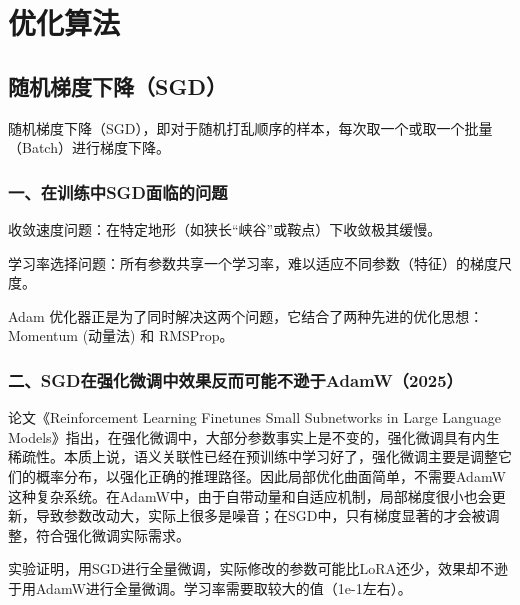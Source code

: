 \hypertarget{ux4f18ux5316ux7b97ux6cd5}{%
\chapter{优化算法}\label{ux4f18ux5316ux7b97ux6cd5}}

\hypertarget{ux968fux673aux68afux5ea6ux4e0bux964dsgd}{%
\section{随机梯度下降（SGD）}\label{ux968fux673aux68afux5ea6ux4e0bux964dsgd}}

随机梯度下降（SGD），即对于随机打乱顺序的样本，每次取一个或取一个批量（Batch）进行梯度下降。

\hypertarget{ux4e00ux5728ux8badux7ec3ux4e2dsgdux9762ux4e34ux7684ux95eeux9898}{%
\subsection{一、在训练中SGD面临的问题}\label{ux4e00ux5728ux8badux7ec3ux4e2dsgdux9762ux4e34ux7684ux95eeux9898}}

收敛速度问题：在特定地形（如狭长``峡谷''或鞍点）下收敛极其缓慢。

学习率选择问题：所有参数共享一个学习率，难以适应不同参数（特征）的梯度尺度。

Adam 优化器正是为了同时解决这两个问题，它结合了两种先进的优化思想：Momentum (动量法) 和 RMSProp。

\hypertarget{ux4e8csgdux5728ux5f3aux5316ux5faeux8c03ux4e2dux6548ux679cux53cdux800cux53efux80fdux4e0dux900aux4e8eadamw2025}{%
\subsection{二、SGD在强化微调中效果反而可能不逊于AdamW（2025）}\label{ux4e8csgdux5728ux5f3aux5316ux5faeux8c03ux4e2dux6548ux679cux53cdux800cux53efux80fdux4e0dux900aux4e8eadamw2025}}

论文《Reinforcement Learning Finetunes Small Subnetworks in Large Language Models》指出，在强化微调中，大部分参数事实上是不变的，强化微调具有内生稀疏性。本质上说，语义关联性已经在预训练中学习好了，强化微调主要是调整它们的概率分布，以强化正确的推理路径。因此局部优化曲面简单，不需要AdamW这种复杂系统。在AdamW中，由于自带动量和自适应机制，局部梯度很小也会更新，导致参数改动大，实际上很多是噪音；在SGD中，只有梯度显著的才会被调整，符合强化微调实际需求。

实验证明，用SGD进行全量微调，实际修改的参数可能比LoRA还少，效果却不逊于用AdamW进行全量微调。学习率需要取较大的值（1e-1左右）。

